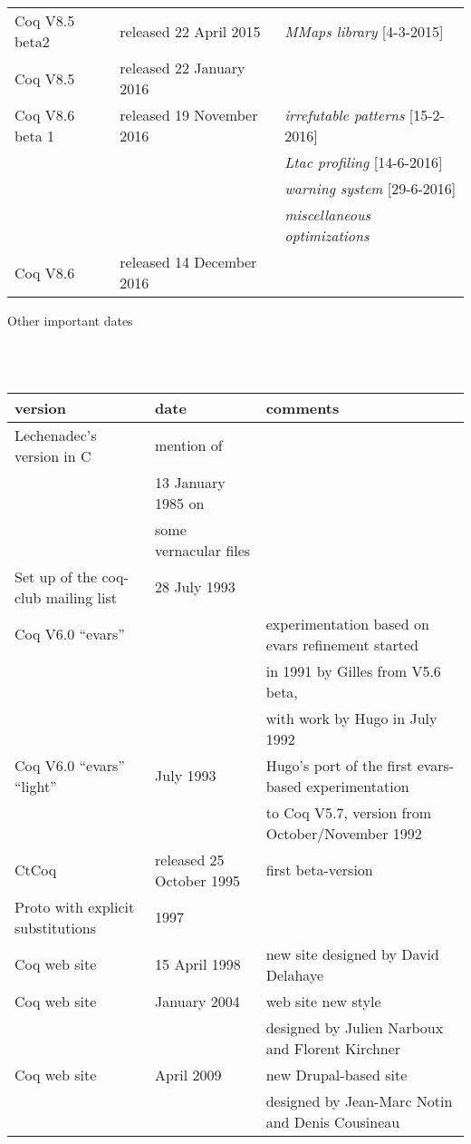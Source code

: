 \documentclass[a4paper]{book}
\newcommand{\feature}[1]{{\em #1}}
\begin{document}
\begin{tabular}{l|l|l}
Coq V8.5 beta2 & released 22 April 2015 & \feature{MMaps library} [4-3-2015]\\

Coq V8.5 & released 22 January 2016 & \\

Coq V8.6 beta 1 & released 19 November 2016 & \feature{irrefutable patterns} [15-2-2016]\\
&& \feature{Ltac profiling} [14-6-2016]\\
&& \feature{warning system} [29-6-2016]\\
&& \feature{miscellaneous optimizations}\\

Coq V8.6 & released 14 December 2016 & \\

\end{tabular}

\medskip
\bigskip
\newpage

\centerline{\large Other important dates}
\mbox{}\\
\mbox{}\\
\begin{tabular}{l|l|l}
version & date & comments \\
\hline
Lechenadec's version in C& mention of \\
 & 13 January 1985 on \\
 & some vernacular files\\
Set up of the coq-club mailing list & 28 July 1993\\

Coq V6.0 ``evars'' & & experimentation based on evars
refinement started \\
  & & in 1991 by Gilles from V5.6 beta,\\
  & & with work by Hugo in July 1992\\

Coq V6.0 ``evars'' ``light'' & July 1993 & Hugo's port of the first
evars-based experimentation \\
 & & to Coq V5.7, version from October/November
1992\\

CtCoq & released 25 October 1995 & first beta-version  \\ %

Proto with explicit substitutions & 1997 &\\

Coq web site & 15 April 1998 & new site designed by David Delahaye \\

Coq web site & January 2004 & web site new style \\
  & & designed by Julien Narboux and Florent Kirchner \\

Coq web site & April 2009 & new Drupal-based site \\
  & & designed by Jean-Marc Notin and Denis Cousineau \\

\end{tabular}
\end{document}
